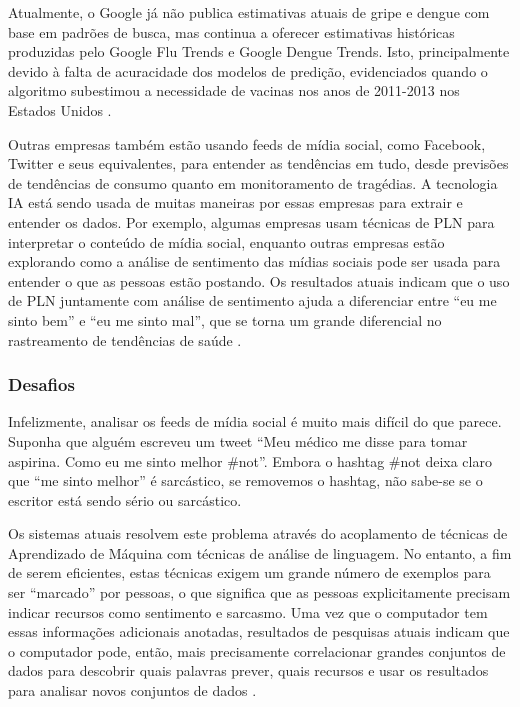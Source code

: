 \documentclass[
	12pt,				%
	openright,			%
	oneside,			%
	a4paper,			%
	english,			%
	spanish,			%
	brazil				%
	]{abntex2}
\begin{document}
Atualmente, o Google já não publica estimativas atuais de gripe e dengue com base em padrões de busca, mas continua a oferecer estimativas históricas produzidas pelo Google Flu Trends e Google Dengue Trends. Isto, principalmente devido à falta de acuracidade dos modelos de predição, evidenciados quando o algoritmo subestimou a necessidade de vacinas nos anos de 2011-2013 nos Estados Unidos  \cite{article_google_flu}.

Outras empresas também estão usando feeds de mídia social, como Facebook, Twitter e seus equivalentes, para entender as tendências em tudo, desde previsões de tendências de consumo quanto em monitoramento de tragédias. A tecnologia IA está sendo usada de muitas maneiras por essas empresas para extrair e entender os dados. Por exemplo, algumas empresas usam técnicas de PLN para interpretar o conteúdo de mídia social, enquanto outras empresas estão explorando como a análise de sentimento das mídias sociais pode ser usada para entender o que as pessoas estão postando. Os resultados atuais indicam que o uso de PLN juntamente com análise de sentimento ajuda a diferenciar entre ``eu me sinto bem'' e ``eu me sinto mal'', que se torna um grande diferencial no rastreamento de tendências de saúde \cite{book_social_machines}.
	
	\subsubsection*{Desafios}
Infelizmente, analisar os feeds de mídia social é muito mais difícil do que parece. Suponha que alguém escreveu um tweet ``Meu médico me disse para tomar aspirina. Como eu me sinto melhor \#not''. Embora o hashtag \#not deixa claro que ``me sinto melhor'' é sarcástico, se removemos o hashtag, não sabe-se se o escritor está sendo sério ou sarcástico.

Os sistemas atuais resolvem este problema através do acoplamento de técnicas de Aprendizado de Máquina com técnicas de análise de linguagem. No entanto, a fim de serem eficientes, estas técnicas exigem um grande número de exemplos para ser ``marcado'' por pessoas, o que significa que as pessoas explicitamente precisam indicar recursos como sentimento e sarcasmo. Uma vez que o computador tem essas informações adicionais anotadas, resultados de pesquisas atuais indicam que o computador pode, então, mais precisamente correlacionar grandes conjuntos de dados para descobrir quais palavras prever, quais recursos  e usar os resultados para analisar novos conjuntos de dados \cite{book_social_machines}.
\end{document}
